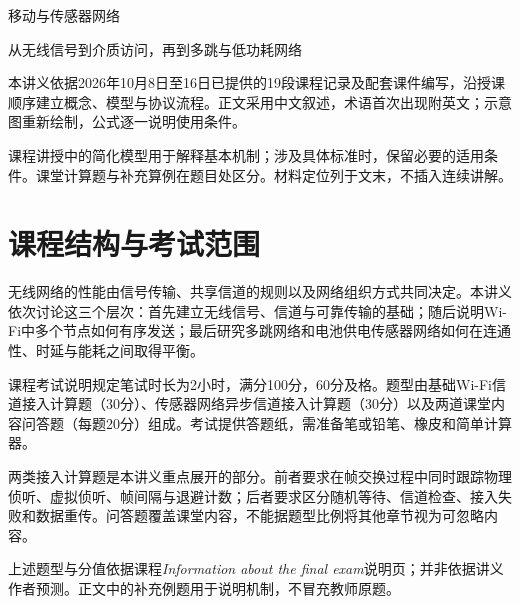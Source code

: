 \documentclass[11pt,a4paper]{article}
\begin{document}
\begin{titlepage}
\vspace*{24mm}
{\sffamily\color{inkblue}\Huge 移动与传感器网络\par}
\vspace{6mm}{\Large Mobile and Sensor Networks\par}
\vspace{12mm}{\LARGE 课程讲义\par}
\vspace{16mm}
{\large 从无线信号到介质访问，再到多跳与低功耗网络\par}
\vfill
\noindent 本讲义依据2026年10月8日至16日已提供的19段课程记录及配套课件编写，沿授课顺序建立概念、模型与协议流程。正文采用中文叙述，术语首次出现附英文；示意图重新绘制，公式逐一说明使用条件。\par
\vspace{5mm}
\noindent 课程讲授中的简化模型用于解释基本机制；涉及具体标准时，保留必要的适用条件。课堂计算题与补充算例在题目处区分。材料定位列于文末，不插入连续讲解。\par
\vspace{8mm}{\small 2026年10月19日\par}
\end{titlepage}
\section*{课程结构与考试范围}
无线网络的性能由信号传输、共享信道的规则以及网络组织方式共同决定。本讲义依次讨论这三个层次：首先建立无线信号、信道与可靠传输的基础；随后说明Wi-Fi中多个节点如何有序发送；最后研究多跳网络和电池供电传感器网络如何在连通性、时延与能耗之间取得平衡。

课程考试说明规定笔试时长为2小时，满分100分，60分及格。题型由基础Wi-Fi信道接入计算题（30分）、传感器网络异步信道接入计算题（30分）以及两道课堂内容问答题（每题20分）组成。考试提供答题纸，需准备笔或铅笔、橡皮和简单计算器。

两类接入计算题是本讲义重点展开的部分。前者要求在帧交换过程中同时跟踪物理侦听、虚拟侦听、帧间隔与退避计数；后者要求区分随机等待、信道检查、接入失败和数据重传。问答题覆盖课堂内容，不能据题型比例将其他章节视为可忽略内容。

上述题型与分值依据课程\textit{Information about the final exam}说明页；并非依据讲义作者预测。正文中的补充例题用于说明机制，不冒充教师原题。\clearpage
\setcounter{tocdepth}{2}
\tableofcontents\clearpage



\clearpage

\end{document}

